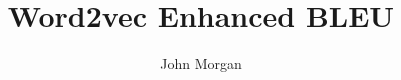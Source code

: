 \documentclass[final]{beamer}
\title[Word2vec BLEU]{Word2vec Enhanced BLEU}
\author[Morgan]{John Morgan}
\institute[UMD]{University of Maryland}
\date{}
\begin{document}
\begin{frame}{}
\vfill
\begin{beamercolorbox}{}
\maketitle
\end{beamercolorbox}
  \vskip 0.1in
\begin{columns}[t]
\begin{column}{.50\linewidth}


\end{column}
\begin{column}{.50\linewidth}



%
\end{column}
\end{columns}
\end{frame}
\end{document}
